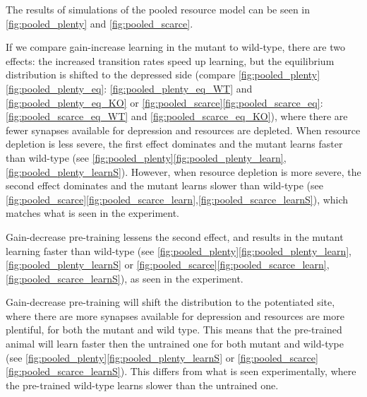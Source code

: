 \documentclass[12pt]{article}
\begin{document}
The results of simulations of the pooled resource model can be seen in \autoref{fig:pooled_plenty} and \autoref{fig:pooled_scarce}.

If we compare gain-increase learning in the mutant to wild-type, there are two effects: the increased transition rates speed up learning, but the equilibrium distribution is shifted to the depressed side (compare \autoref{fig:pooled_plenty}\ref{fig:pooled_plenty_eq}: \ref{fig:pooled_plenty_eq_WT} and \ref{fig:pooled_plenty_eq_KO} or \autoref{fig:pooled_scarce}\ref{fig:pooled_scarce_eq}: \ref{fig:pooled_scarce_eq_WT} and \ref{fig:pooled_scarce_eq_KO}), where there are fewer synapses available for depression and resources are depleted.
When resource depletion is less severe, the first effect dominates and the mutant learns faster than wild-type (see \autoref{fig:pooled_plenty}\ref{fig:pooled_plenty_learn},\ref{fig:pooled_plenty_learnS}).
However, when resource depletion is more severe, the second effect dominates and the mutant learns slower than wild-type (see \autoref{fig:pooled_scarce}\ref{fig:pooled_scarce_learn},\ref{fig:pooled_scarce_learnS}), which matches what is seen in the experiment.

Gain-decrease pre-training lessens the second effect, and results in the mutant learning faster than wild-type (see \autoref{fig:pooled_plenty}\ref{fig:pooled_plenty_learn},\ref{fig:pooled_plenty_learnS} or \autoref{fig:pooled_scarce}\ref{fig:pooled_scarce_learn},\ref{fig:pooled_scarce_learnS}), as seen in the experiment.

Gain-decrease pre-training will shift the distribution to the potentiated site, where there are more synapses available for depression and resources are more plentiful, for both the mutant and wild type.
This means that the pre-trained animal will learn faster then the untrained one for both mutant and wild-type (see \autoref{fig:pooled_plenty}\ref{fig:pooled_plenty_learnS} or \autoref{fig:pooled_scarce}\ref{fig:pooled_scarce_learnS}).
This differs from what is seen experimentally, where the pre-trained wild-type learns slower than the untrained one.















\end{document}
